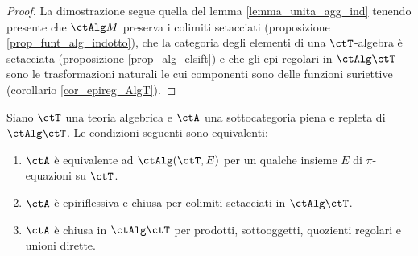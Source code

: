 \begin{proof}
 La dimostrazione segue quella del lemma \ref{lemma_unita_agg_ind} tenendo presente che \(\ctAlg M\)
 preserva i colimiti setacciati (proposizione \ref{prop_funt_alg_indotto}), che la categoria degli elementi di una \(\ctT\)-algebra
 è setacciata (proposizione \ref{prop_alg_elsift}) e che gli epi regolari in \(\ctAlg\ctT\) sono le trasformazioni naturali le cui
 componenti sono delle funzioni suriettive (corollario \ref{cor_epireg_AlgT}).
\end{proof}

\begin{theorem}\label{teo_Birkhoff_AlgT}
 Siano \(\ctT\) una teoria algebrica e \(\ctA\) una sottocategoria piena e repleta di \(\ctAlg\ctT\).
 Le condizioni seguenti sono equivalenti:
 \begin{enumerate}
  \item \(\ctA\) è equivalente ad \(\ctAlg(\ctT,E)\) per un qualche insieme \(E\) di \(\pi\)-equazioni su \(\ctT\).
  \item \(\ctA\) è epiriflessiva e chiusa per colimiti setacciati in \(\ctAlg\ctT\).
  \item \(\ctA\) è chiusa in \(\ctAlg\ctT\) per prodotti, sottooggetti, quozienti regolari e unioni dirette.
 \end{enumerate}
\end{theorem}

